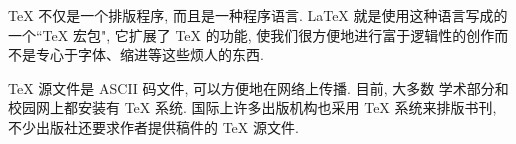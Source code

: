 \TeX{} \index{\TeX} 不仅是一个排版程序, 而且是一种程序语言. \LaTeX{} \index{\TeX}
就是使用这种语言写成的一个``\TeX{} \index{\TeX} 宏包", 它扩展了 \TeX{} \index{\TeX}
的功能, 使我们很方便地进行富于逻辑性的创作而不是专心于字体、缩进等这些烦人的东西.

\TeX{} \index{\TeX} 源文件是 ASCII 码文件, 可以方便地在网络上传播. 目前, 大多数
学术部分和校园网上都安装有 \TeX{} \index{\TeX} 系统. 国际上许多出版机构也采用
\TeX{} \index{\TeX} 系统来排版书刊, 不少出版社还要求作者提供稿件的 \TeX{} \index{\TeX}
源文件.
